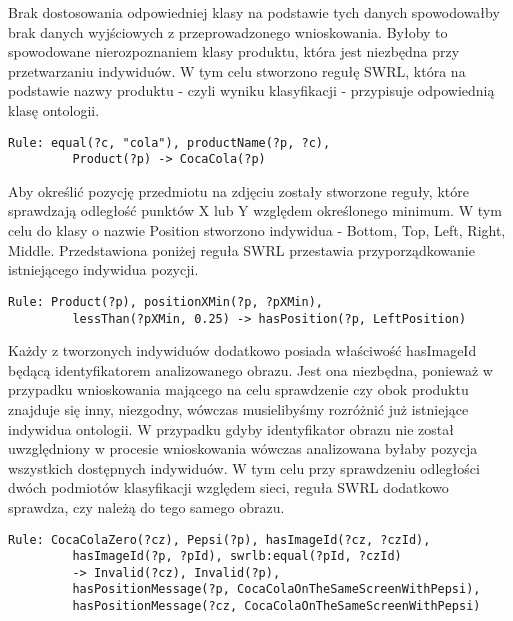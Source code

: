 \begin{itemize}
Brak dostosowania odpowiedniej klasy na podstawie tych danych spowodowałby brak danych wyjściowych z przeprowadzonego wnioskowania. Byłoby to spowodowane nierozpoznaniem klasy produktu, która jest niezbędna przy przetwarzaniu indywiduów. W tym celu stworzono regułę SWRL, która na podstawie nazwy produktu - czyli wyniku klasyfikacji - przypisuje odpowiednią klasę ontologii. 

\begin{lstlisting}[caption={Przypisanie klasy do indywiduum.}]
 Rule: equal(?c, "cola"), productName(?p, ?c), 
		 Product(?p) -> CocaCola(?p)
\end{lstlisting}

Aby określić pozycję przedmiotu na zdjęciu zostały stworzone reguły, które sprawdzają odległość punktów X lub Y względem określonego minimum. W tym celu do klasy o nazwie Position stworzono indywidua - Bottom, Top, Left, Right, Middle. Przedstawiona poniżej reguła SWRL przestawia przyporządkowanie istniejącego indywidua pozycji.

\begin{lstlisting}[caption={Przypisanie pozycji LeftPosition do indywidua na podstawie właściwości XMin.}]
Rule: Product(?p), positionXMin(?p, ?pXMin), 
		 lessThan(?pXMin, 0.25) -> hasPosition(?p, LeftPosition)
\end{lstlisting}

Każdy z tworzonych indywiduów dodatkowo posiada właściwość hasImageId będącą identyfikatorem analizowanego obrazu. Jest ona niezbędna, ponieważ w przypadku wnioskowania mającego na celu sprawdzenie czy obok produktu znajduje się inny, niezgodny, wówczas musielibyśmy rozróżnić już istniejące indywidua ontologii. W przypadku gdyby identyfikator obrazu nie został uwzględniony w procesie wnioskowania wówczas analizowana byłaby pozycja wszystkich dostępnych indywiduów. W tym celu przy sprawdzeniu odległości dwóch podmiotów klasyfikacji względem sieci, reguła SWRL dodatkowo sprawdza, czy należą do tego samego obrazu.

\begin{lstlisting}[caption={Reguła sprawdzająca czy indywidua klas Pepsi oraz CocaColaZero znajdują się na tym samym obrazie.}]
Rule: CocaColaZero(?cz), Pepsi(?p), hasImageId(?cz, ?czId), 
		 hasImageId(?p, ?pId), swrlb:equal(?pId, ?czId) 
		 -> Invalid(?cz), Invalid(?p), 
		 hasPositionMessage(?p, CocaColaOnTheSameScreenWithPepsi),
		 hasPositionMessage(?cz, CocaColaOnTheSameScreenWithPepsi)
\end{lstlisting}


\end{itemize}
